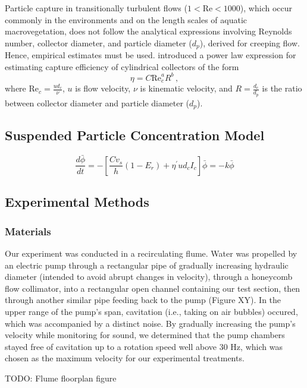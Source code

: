 \documentclass[10pt,a4paper]{article}
\newcommand\Rey{\mathrm{Re}}
\begin{document}
Particle capture in transitionally turbulent flows (\(1<\Rey<1000\)), which occur commonly in the environments and on the length scales of aquatic macrovegetation, does not follow the analytical expressions involving Reynolds number, collector diameter, and particle diameter (\(d_p\)), derived for creeping flow. Hence, empirical estimates must be used. \citet{Palmer_2004} introduced a power law expression for estimating capture efficiency of cylindrical collectors of the form \[\eta=C\Rey_c^{a}R^{b}\,,\] where \(\Rey_c=\frac{ud_c}{\nu}\), \(u\) is flow velocity, \(\nu\) is kinematic velocity, and \(R=\frac{d_c}{d_p}\) is the ratio between collector diameter and particle diameter (\(d_p\)).

\subsection{Suspended Particle Concentration Model}

\[\frac{d\bar{\phi}}{dt} = -[\frac{Cv_s}{h}(1-E_r) + \eta^{\prime}ud_cI_c]\bar{\phi} = -k\bar{\phi}\]

\subsection{Experimental Methods}

\subsubsection{Materials}

Our experiment was conducted in a recirculating flume. Water was propelled by an electric pump through a rectangular pipe of gradually increasing hydraulic diameter (intended to avoid abrupt changes in velocity), through a honeycomb flow collimator, into a rectangular open channel containing our test section, then through another similar pipe feeding back to the pump (Figure XY). In the upper range of the pump's span, cavitation (i.e., taking on air bubbles) occured, which was accompanied by a distinct noise. By gradually increasing the pump's velocity while monitoring for sound, we determined that the pump chambers stayed free of cavitation up to a rotation speed well above 30 Hz, which was chosen as the maximum velocity for our experimental treatments.

TODO: Flume floorplan figure
\end{document}

